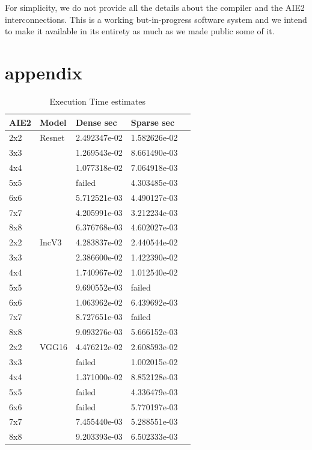 \documentclass[conference]{IEEEtran}
\begin{document}
For simplicity, we do not provide all the details about the
compiler and the AIE2 interconnections. This is a working
but-in-progress software system and we intend to make it available in
its entirety as much as we made public some of it.
     
     
\section{appendix}



\begin{table}[htb]
  \caption{Execution Time estimates}
  \label{tab_perf}
\begin{center} 
\begin{tabular}{|l|l|l|l|l|}
  \hline
  AIE2 & Model  & Dense sec      & Sparse sec      \\ \hline\hline
  2x2   & Resnet & 2.492347e-02  & 1.582626e-02 \\ \hline
  3x3   &  & 1.269543e-02  & 8.661490e-03 \\ \hline
  4x4   &  &  1.077318e-02 & 7.064918e-03 \\ \hline
  5x5   &  &  failed       & 4.303485e-03 \\ \hline
  6x6   &  &  5.712521e-03 & 4.490127e-03 \\ \hline
  7x7   &  &  4.205991e-03 & 3.212234e-03 \\ \hline
  8x8   &  &  6.376768e-03 & 4.602027e-03 \\ \hline \hline
  2x2   & IncV3  & 4.283837e-02  & 2.440544e-02 \\ \hline
  3x3   &   & 2.386600e-02  & 1.422390e-02 \\ \hline
  4x4   &   &  1.740967e-02 & 1.012540e-02 \\ \hline
  5x5   &   &  9.690552e-03 & failed       \\ \hline
  6x6   &   &  1.063962e-02 & 6.439692e-03 \\ \hline
  7x7   &   &  8.727651e-03 & failed       \\ \hline
  8x8   &   &  9.093276e-03 & 5.666152e-03 \\ \hline \hline
  2x2   & VGG16  & 4.476212e-02  & 2.608593e-02 \\ \hline
  3x3   &   & failed        & 1.002015e-02 \\ \hline
  4x4   &   &  1.371000e-02 & 8.852128e-03 \\ \hline
  5x5   &   &  failed       & 4.336479e-03 \\ \hline
  6x6   &   &  failed       & 5.770197e-03 \\ \hline
  7x7   &   &  7.455440e-03 & 5.288551e-03 \\ \hline
  8x8   &   &  9.203393e-03 & 6.502333e-03 \\ \hline \hline
          
\end{tabular}
\end{center}
\end{table}
\end{document}
